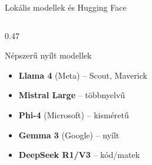 \documentclass[aspectratio=169, 12pt]{beamer}
\begin{document}
\begin{frame}{Lokális modellek és Hugging Face}
\begin{columns}[T,onlytextwidth]
\begin{column}{0.47\textwidth}
      \begin{block}{Népszerű nyílt modellek}
        \begin{itemize}\setlength{\itemsep}{1pt}
          \item \textbf{Llama 4} (Meta) -- Scout, Maverick
          \item \textbf{Mistral Large} -- többnyelvű
          \item \textbf{Phi-4} (Microsoft) -- kisméretű
          \item \textbf{Gemma 3} (Google) -- nyílt
          \item \textbf{DeepSeek R1/V3} -- kód/matek
        \end{itemize}
      \end{block}
    \end{column}
  \end{columns}
\end{frame}

\end{document}
